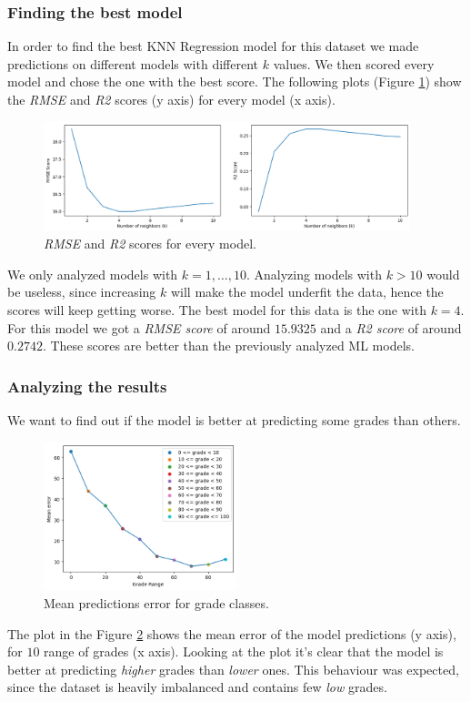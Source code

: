 \documentclass{article}
\begin{document}
\subsubsection{Finding the best model}
In order to find the best KNN Regression model for this dataset we made predictions on different models with different $k$ values. 
We then scored every model and chose the one with the best score. The following plots (Figure \ref{fig:knn-scores}) show the \textit{RMSE} and \textit{R2} scores (y axis) for every model (x axis).
\begin{figure}[ht]
\centering
\includegraphics[width=0.95\textwidth]{KNN_scores.png}
\caption{\textit{RMSE} and \textit{R2} scores for every model.}
\label{fig:knn-scores}
\end{figure}
We only analyzed models with $k = 1, \ldots, 10$.
Analyzing models with $k > 10$ would be useless, since increasing $k$ will make the model underfit the data, hence the scores will keep getting worse.
The best model for this data is the one with $k = 4$.
For this model we got a \textit{RMSE score} of around $15.9325$ and a \textit{R2 score} of around $0.2742$.
These scores are better than the previously analyzed ML models.

\subsubsection{Analyzing the results}
We want to find out if the model is better at predicting some grades than others.
\begin{figure}[ht]
\centering
\includegraphics[width=0.5\textwidth]{KNN_errs_class.png}
\caption{Mean predictions error for grade classes.}
\label{fig:knn-err}
\end{figure}
The plot in the Figure \ref{fig:knn-err} shows the mean error of the model predictions (y axis), for $10$ range of grades (x axis).
Looking at the plot it's clear that the model is better at predicting \textit{higher} grades than \textit{lower} ones.
This behaviour was expected, since the dataset is heavily imbalanced and contains few \textit{low} grades.
\end{document}
